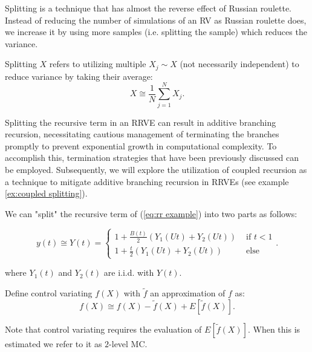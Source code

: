 \documentclass[a4paper,12pt]{article}
\begin{document}
Splitting is a technique that has almost the reverse effect of Russian roulette.
Instead of reducing the number of simulations of an RV as Russian roulette does,
we increase it by using more samples (i.e. splitting the sample) which
reduces the variance.

\begin{definition}[splitting] \label{def:splitting}
    Splitting $X$ refers to utilizing multiple $X_{j} \sim X$ (not necessarily independent) to
    reduce variance by taking their average:
    \begin{equation}
        X \cong \frac{1}{N} \sum_{j=1}^{N} X_{j}.
    \end{equation}
\end{definition}

Splitting the recursive term in an RRVE can result in additive branching recursion,
necessitating cautious management of terminating the branches promptly to prevent
exponential growth in computational complexity. To accomplish this, termination
strategies that have been previously discussed can be employed. Subsequently,
we will explore the utilization of coupled recursion as a technique to mitigate
additive branching recursion in RRVEs (see example \ref{ex:coupled splitting}).

\begin{example} \label{ex:splitting}
    We can "split" the recursive term of (\ref{eq:rr example})
    into two parts as follows:

    \begin{equation}\label{eq:splitting}
        y(t) \cong Y(t) =
        \begin{cases}
            1 + \frac{B(t)}{2}(Y_{1}(Ut) + Y_{2}(Ut)) & \text{ if } t < 1 \\
            1 + \frac{t}{2}(Y_{1}(Ut) + Y_{2}(Ut))    & \text{ else}
        \end{cases}.
    \end{equation}

    where $Y_{1}(t)$ and $Y_{2}(t)$ are i.i.d. with $Y(t)$.
\end{example}

\vspace{0.2cm}

\begin{pythonn}
\end{pythonn}

\begin{definition} \label{CV}
    Define control variating $f(X)$ with $\tilde{f}$ an approximation of $f$ as:
    \begin{equation}
        f(X) \cong f(X)-\tilde{f}(X) + E[\tilde{f}(X)].
    \end{equation}

    Note that control variating requires the evaluation of
    $E[\tilde{f}(X)]$. When this is estimated we refer to it as $2$-level MC.
\end{definition}
\end{document}
